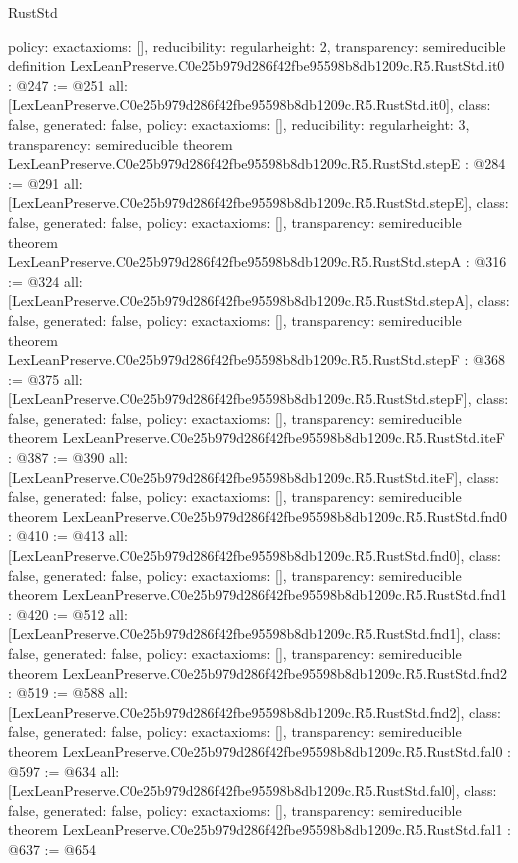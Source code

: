 \begin{lexlean}{RustStd}
\begin{coremodule}
{  policy: exact{axioms: []},
  reducibility: regular{height: 2},
  transparency: semireducible
}
definition LexLeanPreserve.C0e25b979d286f42fbe95598b8db1209c.R5.RustStd.it0 : @247 := @251 {
  all: [LexLeanPreserve.C0e25b979d286f42fbe95598b8db1209c.R5.RustStd.it0],
  class: false,
  generated: false,
  policy: exact{axioms: []},
  reducibility: regular{height: 3},
  transparency: semireducible
}
theorem LexLeanPreserve.C0e25b979d286f42fbe95598b8db1209c.R5.RustStd.stepE : @284 := @291 {
  all: [LexLeanPreserve.C0e25b979d286f42fbe95598b8db1209c.R5.RustStd.stepE],
  class: false,
  generated: false,
  policy: exact{axioms: []},
  transparency: semireducible
}
theorem LexLeanPreserve.C0e25b979d286f42fbe95598b8db1209c.R5.RustStd.stepA : @316 := @324 {
  all: [LexLeanPreserve.C0e25b979d286f42fbe95598b8db1209c.R5.RustStd.stepA],
  class: false,
  generated: false,
  policy: exact{axioms: []},
  transparency: semireducible
}
theorem LexLeanPreserve.C0e25b979d286f42fbe95598b8db1209c.R5.RustStd.stepF : @368 := @375 {
  all: [LexLeanPreserve.C0e25b979d286f42fbe95598b8db1209c.R5.RustStd.stepF],
  class: false,
  generated: false,
  policy: exact{axioms: []},
  transparency: semireducible
}
theorem LexLeanPreserve.C0e25b979d286f42fbe95598b8db1209c.R5.RustStd.iteF : @387 := @390 {
  all: [LexLeanPreserve.C0e25b979d286f42fbe95598b8db1209c.R5.RustStd.iteF],
  class: false,
  generated: false,
  policy: exact{axioms: []},
  transparency: semireducible
}
theorem LexLeanPreserve.C0e25b979d286f42fbe95598b8db1209c.R5.RustStd.fnd0 : @410 := @413 {
  all: [LexLeanPreserve.C0e25b979d286f42fbe95598b8db1209c.R5.RustStd.fnd0],
  class: false,
  generated: false,
  policy: exact{axioms: []},
  transparency: semireducible
}
theorem LexLeanPreserve.C0e25b979d286f42fbe95598b8db1209c.R5.RustStd.fnd1 : @420 := @512 {
  all: [LexLeanPreserve.C0e25b979d286f42fbe95598b8db1209c.R5.RustStd.fnd1],
  class: false,
  generated: false,
  policy: exact{axioms: []},
  transparency: semireducible
}
theorem LexLeanPreserve.C0e25b979d286f42fbe95598b8db1209c.R5.RustStd.fnd2 : @519 := @588 {
  all: [LexLeanPreserve.C0e25b979d286f42fbe95598b8db1209c.R5.RustStd.fnd2],
  class: false,
  generated: false,
  policy: exact{axioms: []},
  transparency: semireducible
}
theorem LexLeanPreserve.C0e25b979d286f42fbe95598b8db1209c.R5.RustStd.fal0 : @597 := @634 {
  all: [LexLeanPreserve.C0e25b979d286f42fbe95598b8db1209c.R5.RustStd.fal0],
  class: false,
  generated: false,
  policy: exact{axioms: []},
  transparency: semireducible
}
theorem LexLeanPreserve.C0e25b979d286f42fbe95598b8db1209c.R5.RustStd.fal1 : @637 := @654 {
}
\end{coremodule}
\end{lexlean}
